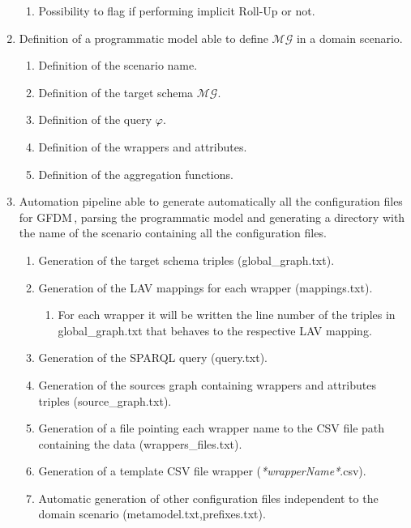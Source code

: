 \documentclass[12pt,a4paper]{report}
\newcommand\systemName{GFDM}
\newcommand\globalQuery{\varphi}
\newcommand\multidimensionalGraph{\mathcal{MG}}
\begin{document}
\begin{enumerate}
\begin{enumerate}
        \item Possibility to flag if performing implicit Roll-Up or not.
    \end{enumerate}
    \item Definition of a programmatic model able to define $\multidimensionalGraph$ in a domain scenario.
    \begin{enumerate}
        \item Definition of the scenario name.
        \item Definition of the target schema $\multidimensionalGraph$.
        \item Definition of the query $\globalQuery$.
        \item Definition of the wrappers and attributes.
        \item Definition of the aggregation functions.
    \end{enumerate}
    \item Automation pipeline able to generate automatically all the configuration files for \systemName\,, parsing the programmatic model and generating a directory with the name of the scenario containing all the configuration files.
    \begin{enumerate}
        \item Generation of the target schema triples (global\_graph.txt).
        \item Generation of the LAV mappings for each wrapper (mappings.txt).
        \begin{enumerate}
            \item For each wrapper it will be written the line number of the triples in global\_graph.txt that behaves to the respective LAV mapping.
        \end{enumerate}
        \item Generation of the SPARQL query (query.txt).
        \item Generation of the sources graph containing wrappers and attributes triples (source\_graph.txt).
        \item Generation of a file pointing each wrapper name to the CSV file path containing the data (wrappers\_files.txt).
        \item Generation of a template CSV file wrapper (\textit{*wrapperName*}.csv).
        \item Automatic generation of other configuration files independent to the domain scenario (metamodel.txt,prefixes.txt).
    \end{enumerate}
\end{enumerate}
\end{document}
